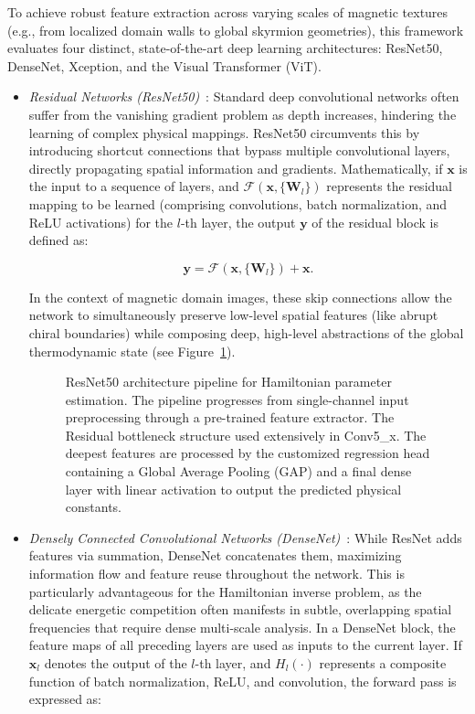 \documentclass[a4paper,fleqn]{cas-sc}
\begin{document}
To achieve robust feature extraction across varying scales of magnetic textures (e.g., from localized domain walls to global skyrmion geometries), this framework evaluates four distinct, state-of-the-art deep learning architectures: ResNet50, DenseNet, Xception, and the Visual Transformer (ViT).

\begin{itemize}

\item[--] \emph{Residual Networks (ResNet50)}~\cite{koonce2021resnet}: Standard deep convolutional networks often suffer from the vanishing gradient problem as depth increases, hindering the learning of complex physical mappings. ResNet50 circumvents this by introducing shortcut connections that bypass multiple convolutional layers, directly propagating spatial information and gradients. Mathematically, if $\mathbf{x}$ is the input to a sequence of layers, and $\mathcal{F}(\mathbf{x}, \{\mathbf{W}_l\})$ represents the residual mapping to be learned (comprising convolutions, batch normalization, and ReLU activations) for the $l$-th layer, the output $\mathbf{y}$ of the residual block is defined as:

\begin{equation}\label{eq:ResNet}
\mathbf{y} = \mathcal{F}(\mathbf{x}, \{\mathbf{W}_l\}) + \mathbf{x}.
\end{equation}

In the context of magnetic domain images, these skip connections allow the network to simultaneously preserve low-level spatial features (like abrupt chiral boundaries) while composing deep, high-level abstractions of the global thermodynamic state (see Figure~\ref{fig:resnet_implementation}).

\begin{figure}[pos=htbp]
    \centering
    \resizebox{\linewidth}{!}{
    }
\caption{ResNet50 architecture pipeline for Hamiltonian parameter estimation. The pipeline progresses from single-channel input preprocessing through a pre-trained feature extractor. The Residual bottleneck structure used extensively in Conv5\_x. The deepest features are processed by the customized regression head containing a Global Average Pooling (GAP) and a final dense layer with linear activation to output the predicted physical constants.}
\label{fig:resnet_implementation}
\end{figure}

\item[--] \emph{Densely Connected Convolutional Networks (DenseNet)}~\cite{huang2017densely}: While ResNet adds features via summation, DenseNet concatenates them, maximizing information flow and feature reuse throughout the network. This is particularly advantageous for the Hamiltonian inverse problem, as the delicate energetic competition often manifests in subtle, overlapping spatial frequencies that require dense multi-scale analysis. In a DenseNet block, the feature maps of all preceding layers are used as inputs to the current layer. If $\mathbf{x}_l$ denotes the output of the $l$-th layer, and $H_l(\cdot)$ represents a composite function of batch normalization, ReLU, and convolution, the forward pass is expressed as:


\end{itemize}
\end{document}
